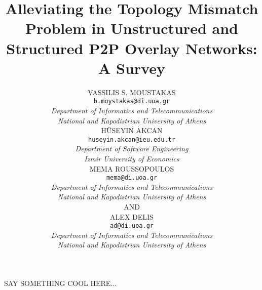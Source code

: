 \documentclass[acmcsur,acmnow]{acmtrans2m}
\title{Alleviating the Topology Mismatch Problem in Unstructured and Structured
P2P Overlay Networks: A Survey}
\author{
VASSILIS S. MOUSTAKAS\\
\texttt{b.moystakas@di.uoa.gr}\\
\emph{Department of Informatics and Telecommunications}\\
\emph{National and Kapodistrian University of Athens}\\
H\"USEYIN AKCAN\\
\texttt{huseyin.akcan@ieu.edu.tr}\\
\emph{Department of Software Engineering}\\
\emph{Izmir University of Economics}\\
MEMA ROUSSOPOULOS\\
\texttt{mema@di.uoa.gr}\\
\emph{Department of Informatics and Telecommunications}\\
\emph{National and Kapodistrian University of Athens}\\
AND\\
ALEX DELIS\\
\texttt{ad@di.uoa.gr}\\
\emph{Department of Informatics and Telecommunications}\\
\emph{National and Kapodistrian University of Athens}
}
\begin{document}
\begin{bottomstuff}
SAY SOMETHING COOL HERE...
\end{bottomstuff}

\maketitle




%
%
%
%
%





%
%
\end{document}
